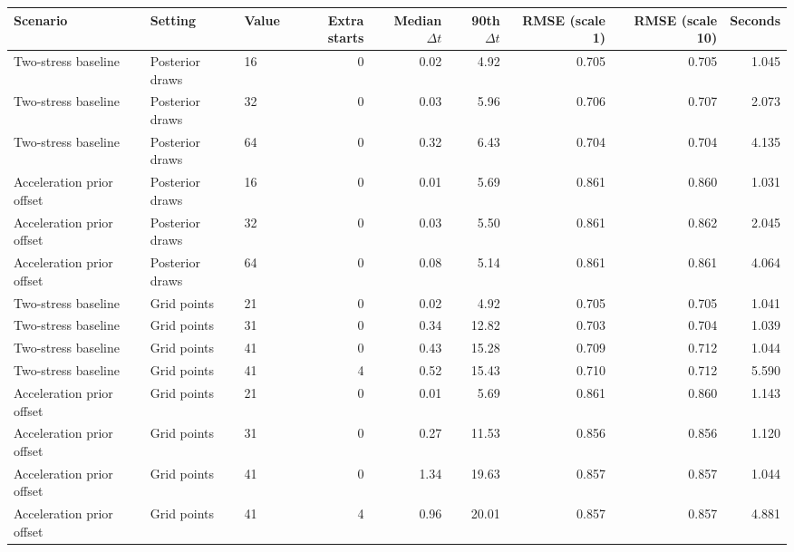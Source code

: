 \begin{tabular}{lllrrrrrr}
\toprule
Scenario & Setting & Value & Extra starts & Median $\Delta t$ & 90th $\Delta t$ & RMSE (scale 1) & RMSE (scale 10) & Seconds \\
\midrule
Two-stress baseline & Posterior draws & 16 & 0 & 0.02 & 4.92 & 0.705 & 0.705 & 1.045 \\
Two-stress baseline & Posterior draws & 32 & 0 & 0.03 & 5.96 & 0.706 & 0.707 & 2.073 \\
Two-stress baseline & Posterior draws & 64 & 0 & 0.32 & 6.43 & 0.704 & 0.704 & 4.135 \\
Acceleration prior offset & Posterior draws & 16 & 0 & 0.01 & 5.69 & 0.861 & 0.860 & 1.031 \\
Acceleration prior offset & Posterior draws & 32 & 0 & 0.03 & 5.50 & 0.861 & 0.862 & 2.045 \\
Acceleration prior offset & Posterior draws & 64 & 0 & 0.08 & 5.14 & 0.861 & 0.861 & 4.064 \\
Two-stress baseline & Grid points & 21 & 0 & 0.02 & 4.92 & 0.705 & 0.705 & 1.041 \\
Two-stress baseline & Grid points & 31 & 0 & 0.34 & 12.82 & 0.703 & 0.704 & 1.039 \\
Two-stress baseline & Grid points & 41 & 0 & 0.43 & 15.28 & 0.709 & 0.712 & 1.044 \\
Two-stress baseline & Grid points & 41 & 4 & 0.52 & 15.43 & 0.710 & 0.712 & 5.590 \\
Acceleration prior offset & Grid points & 21 & 0 & 0.01 & 5.69 & 0.861 & 0.860 & 1.143 \\
Acceleration prior offset & Grid points & 31 & 0 & 0.27 & 11.53 & 0.856 & 0.856 & 1.120 \\
Acceleration prior offset & Grid points & 41 & 0 & 1.34 & 19.63 & 0.857 & 0.857 & 1.044 \\
Acceleration prior offset & Grid points & 41 & 4 & 0.96 & 20.01 & 0.857 & 0.857 & 4.881 \\
\bottomrule
\end{tabular}

